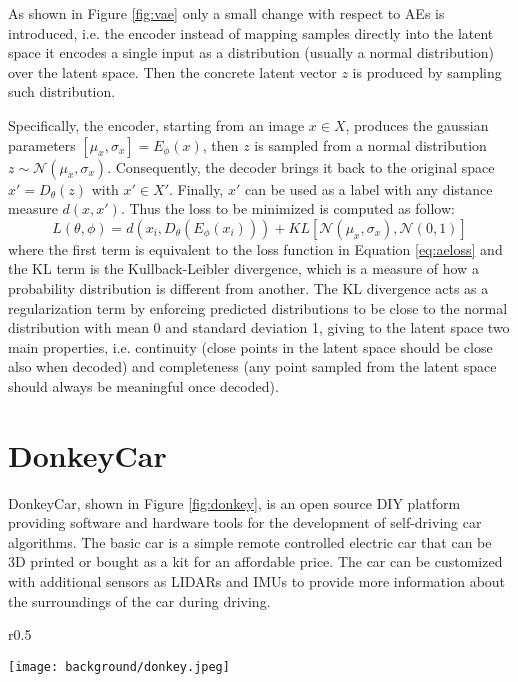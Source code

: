As shown in Figure \ref{fig:vae} only a small change with respect to AEs is introduced, i.e. the encoder instead of mapping samples directly into the latent space it encodes a single input as a distribution (usually a normal distribution) over the latent space. Then the concrete latent vector $z$ is produced by sampling such distribution. 

Specifically, the encoder, starting from an image $x\in X$, produces the gaussian parameters ${[\mu_x, \sigma_x]=E_{\phi }(x)}$, then $z$ is sampled from a normal distribution $z \sim \mathcal{N}(\mu_x, \sigma_x)$. Consequently, the decoder brings it back to the original space ${x'=D_{\theta }(z)}$ with $x'\in X'$. Finally, $x'$ can be used as a label with any distance measure $d(x,x')$. Thus the loss to be minimized is computed as follow:
\begin{equation}
\label{eq:vaeloss}
  L(\theta ,\phi) = d(x_{i},D_{\theta }(E_{\phi }(x_{i}))) + KL[\mathcal{N} (\mu_x, \sigma_x),\mathcal{N}(0, 1)]
\end{equation}
where the first term is equivalent to the loss function in Equation \ref{eq:aeloss} and the KL term is the Kullback-Leibler divergence, which is a measure of how a probability distribution is different from another. The KL divergence acts as a regularization term by enforcing predicted distributions to be close to the normal distribution with mean 0 and standard deviation 1, giving to the latent space two main properties, i.e. continuity (close points in the latent space should be close also when decoded) and completeness (any point sampled from the latent space should always be meaningful once decoded). 

\section{DonkeyCar} \label{sec:donkeycar}
DonkeyCar, shown in Figure \ref{fig:donkey}, is an open source DIY platform providing software and hardware tools for the development of self-driving car algorithms. The basic car is a simple remote controlled electric car that can be 3D printed or bought as a kit for an affordable price. The car can be customized with additional sensors as LIDARs and IMUs to provide more information about the surroundings of the car during driving.

\begin{wrapfigure}[19]{r}{0.5\textwidth}
  \begin{center}
    \texttt{[image: background/donkey.jpeg]}
  \end{center}
  \caption{Assembled donkeycar}
  \label{fig:donkey}
\end{wrapfigure}

